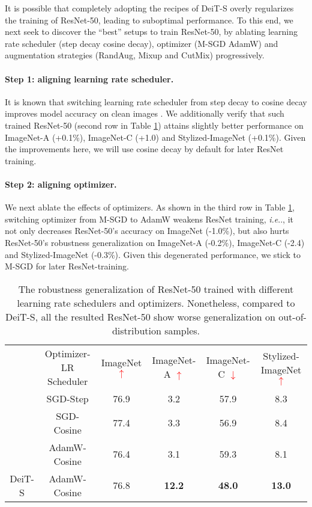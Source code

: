 \documentclass{article}
\makeatletter
\def\vs{{\bm{s}}}
\DeclareRobustCommand\onedot{\futurelet\@let@token\@onedot}
\def\@onedot{\ifx\@let@token.\else.\null\fi\xspace}
\def\ie{\emph{i.e}\onedot} \def\Ie{\emph{I.e}\onedot}
\makeatother
\begin{document}
It is possible that completely adopting the recipes of DeiT-S overly regularizes the training of ResNet-50, leading to suboptimal performance. To this end, we next seek to discover the ``best'' setups to train ResNet-50, by ablating learning rate scheduler (step decay \vs cosine decay), optimizer (M-SGD \vs AdamW) and augmentation strategies (RandAug, Mixup and CutMix) progressively.

\paragraph{Step 1: aligning learning rate scheduler.} 
It is known that switching learning rate scheduler from step decay to cosine decay improves model accuracy on clean images \cite{bello2021revisiting}. We additionally verify that such trained ResNet-50 (second row in Table \ref{tab:optimizer}) attains slightly better performance on ImageNet-A (+0.1\%), ImageNet-C (+1.0) and Stylized-ImageNet (+0.1\%). Given the improvements here, we will use cosine decay by default for later ResNet training.


\paragraph{Step 2: aligning optimizer.} 
We next ablate the effects of optimizers. As shown in the third row in Table \ref{tab:optimizer}, switching optimizer from M-SGD to AdamW weakens ResNet training, \ie, it not only decreases ResNet-50's accuracy on ImageNet (-1.0\%), but also hurts ResNet-50's robustness generalization on ImageNet-A (-0.2\%), ImageNet-C (-2.4) and Stylized-ImageNet (-0.3\%). Given this degenerated performance, we stick to M-SGD for later ResNet-training.


\begin{table}[!ht]
\caption{The robustness generalization of ResNet-50 trained with different learning rate schedulers and optimizers. Nonetheless, compared to DeiT-S, all the resulted ResNet-50 show worse generalization on out-of-distribution samples.}
\footnotesize
\centering
\begin{tabular}{c|c|c|c|c|c}
\shline
                            & Optimizer-LR Scheduler & ImageNet \textcolor{red}{$\uparrow$}& ImageNet-A \textcolor{red}{$\uparrow$} & ImageNet-C \textcolor{red}{$\downarrow$}& Stylized-ImageNet \textcolor{red}{$\uparrow$}\\ \shline \multirow{3}{*}{ResNet-50}  & SGD-Step       &   76.9        &   3.2        &    57.9       &    8.3     \\ 
                            & SGD-Cosine       &   77.4      &   3.3      &    56.9       &    8.4    \\ 
                            & AdamW-Cosine     &    76.4      &    3.1        &     59.3       &     8.1    \\ \hline 
DeiT-S & AdamW-Cosine     &  76.8        &  \textbf{12.2}         &   \textbf{48.0}        &     \textbf{13.0}     \\ \hline 
\end{tabular}
\label{tab:optimizer}
\end{table}
\end{document}
